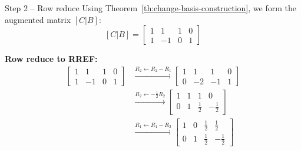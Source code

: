 \documentclass[aspectratio=169]{beamer}\usepackage[]{graphicx}\usepackage[]{xcolor}
\begin{document}
\begin{frame}{Step 2 -- Row reduce}
Using Theorem~\ref{th:change-basis-construction}, we form the augmented matrix $[C|B]$:
$$[C|B] = \left[\begin{array}{cc|cc} 1 & 1 & 1 & 0 \\ 1 & -1 & 0 & 1 \end{array}\right]$$

\vfill
\textbf{Row reduce to RREF:}
\begin{align*}
\left[\begin{array}{cc|cc} 1 & 1 & 1 & 0 \\ 1 & -1 & 0 & 1 \end{array}\right] &\xrightarrow{R_2 \leftarrow R_2 - R_1} \left[\begin{array}{cc|cc} 1 & 1 & 1 & 0 \\ 0 & -2 & -1 & 1 \end{array}\right] \\
&\xrightarrow{R_2 \leftarrow -\frac{1}{2}R_2} \left[\begin{array}{cc|cc} 1 & 1 & 1 & 0 \\ 0 & 1 & \frac{1}{2} & -\frac{1}{2} \end{array}\right] \\
&\xrightarrow{R_1 \leftarrow R_1 - R_2} \left[\begin{array}{cc|cc} 1 & 0 & \frac{1}{2} & \frac{1}{2} \\ 0 & 1 & \frac{1}{2} & -\frac{1}{2} \end{array}\right]
\end{align*}
\end{frame}
\end{document}
